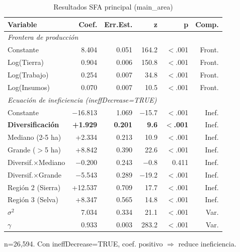 \documentclass[11pt,a4paper]{article}
\begin{document}
\begin{table}[H]
\centering
\caption{Resultados SFA principal (main\_area)}
\label{tab:sfa_main}
\begin{threeparttable}
\small
\begin{tabular}{lrrrrr}
\toprule
\textbf{Variable} & \textbf{Coef.} & \textbf{Err.Est.} & \textbf{z} & \textbf{p} & \textbf{Comp.} \\
\midrule
\multicolumn{6}{l}{\textit{Frontera de producción}} \\
Constante & 8.404 & 0.051 & 164.2 & $<$.001 & Front. \\
Log(Tierra) & 0.904 & 0.006 & 150.8 & $<$.001 & Front. \\
Log(Trabajo) & 0.254 & 0.007 & 34.8 & $<$.001 & Front. \\
Log(Insumos) & 0.070 & 0.007 & 10.5 & $<$.001 & Front. \\
\midrule
\multicolumn{6}{l}{\textit{Ecuación de ineficiencia (ineffDecrease=TRUE)}} \\
Constante & $-$16.813 & 1.069 & $-$15.7 & $<$.001 & Inef. \\
\textbf{Diversificación} & \textbf{+1.929} & \textbf{0.201} & \textbf{9.6} & \textbf{$<$.001} & Inef. \\
Mediano (2-5 ha) & +2.334 & 0.213 & 10.9 & $<$.001 & Inef. \\
Grande ($>$5 ha) & +8.842 & 0.390 & 22.6 & $<$.001 & Inef. \\
Diversif.$\times$Mediano & $-$0.200 & 0.243 & $-$0.8 & 0.411 & Inef. \\
Diversif.$\times$Grande & $-$5.543 & 0.289 & $-$19.2 & $<$.001 & Inef. \\
Región 2 (Sierra) & +12.537 & 0.709 & 17.7 & $<$.001 & Inef. \\
Región 3 (Selva) & +8.347 & 0.565 & 14.8 & $<$.001 & Inef. \\
\midrule
$\sigma^2$ & 7.034 & 0.334 & 21.1 & $<$.001 & Var. \\
$\gamma$ & 0.933 & 0.003 & 283.2 & $<$.001 & Var. \\
\bottomrule
\end{tabular}
\begin{tablenotes}
\footnotesize
\item n=26,594. Con ineffDecrease=TRUE, coef. positivo $\Rightarrow$ reduce ineficiencia.
\end{tablenotes}
\end{threeparttable}
\end{table}
\end{document}
